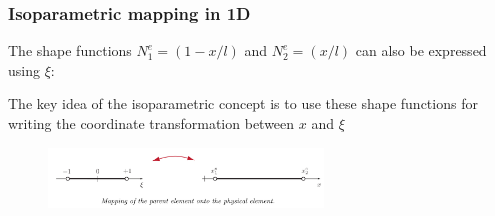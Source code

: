 \documentclass[notes]{beamer}
\begin{document}
\begin{frame}
\frametitle{Isoparametric mapping in 1D}
The shape functions $N_1^e = (1 - x/l)$ and $N_2^e = (x/l)$ can also be expressed using $\xi$:

The key idea of the isoparametric concept is to use these shape functions for writing the
coordinate transformation between $x$ and $\xi$ 

\begin{figure}[ht]
	\centering
	\includegraphics[width=0.65\textwidth]{figs/1d-isoparametric-shapefn.png}
\end{figure}
\end{frame}
\end{document}
